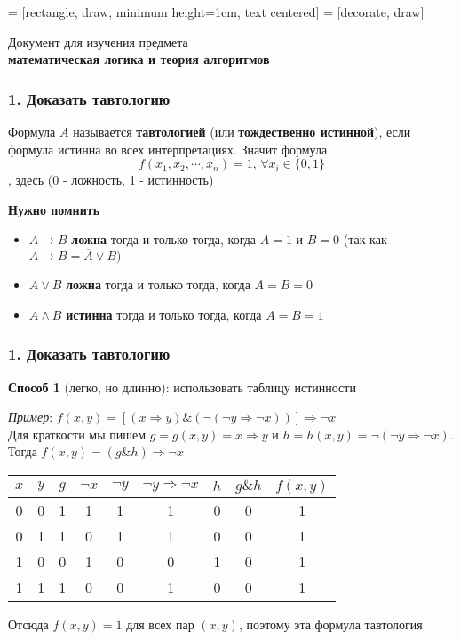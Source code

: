 \documentclass{beamer}
\begin{document}
	 = [rectangle,	draw, minimum height=1cm,	text centered]
	 = [decorate, draw]
\begin{frame}
	\centering
	Документ для изучения предмета \\ \textbf{математическая логика и теория алгоритмов}
\end{frame}

\begin{frame}
	\frametitle{1. Доказать тавтологию}
	Формула $A$ называется \textbf{тавтологией} (или \textbf{тождественно истинной}), если формула истинна во всех интерпретациях. Значит формула \[f(x_1, x_2, \cdots, x_n) = 1 \text{, }\forall x_i \in \{0, 1\}\] , здесь (0 - ложность, 1 - истинность)
	
	\textbf{Нужно помнить}
	\begin{itemize}
		\item $A \rightarrow B$ \textbf{ложна} тогда и только тогда, когда $A=1$ и $B=0$ (так как $A \rightarrow B = \overline{A} \lor B)$
		\item $A \lor B$ \textbf{ложна} тогда и только тогда, когда $A=B=0$
		\item $A \land B$ \textbf{истинна} тогда и только тогда, когда $A=B=1$
	\end{itemize}
\end{frame}

\begin{frame}
	\frametitle{1. Доказать тавтологию}
	\textbf{Способ 1} (легко, но длинно): использовать таблицу истинности
	
	\textit{Пример}: $f(x, y) = [(x \Rightarrow y) \& (\lnot(\lnot y \Rightarrow \lnot x))] \Rightarrow \lnot x$ \\ Для краткости мы пишем $g = g(x, y) = x \Rightarrow y$ и $h = h(x, y) = \lnot (\lnot y \Rightarrow \lnot x)$. Тогда $f(x, y) = (g \& h) \Rightarrow \lnot x$
	\begin{table}
		\centering
		\begin{tabular}{|c|c|c|c|c|c|c|c|c|}
			\hline
			$x$ & $y$ & $g$ & $\lnot x$ & $\lnot y$ & $\lnot y \Rightarrow \lnot x$ & $h$ & $g \& h$ & $f(x, y)$ \\ \hline
			0 & 0 & 1 & 1 & 1 & 1 & 0 & 0 & 1 \\ \hline
			0 & 1 & 1 & 0 & 1 & 1 & 0 & 0 & 1 \\ \hline
			1 & 0 & 0 & 1 & 0 & 0 & 1 & 0 & 1 \\ \hline
			1 & 1 & 1 & 0 & 0 & 1 & 0 & 0 & 1 \\ \hline
		\end{tabular}
	\end{table}
	Отсюда $f(x, y) = 1$ для всех пар $(x, y)$, поэтому эта формула тавтология
\end{frame}
\end{document}
